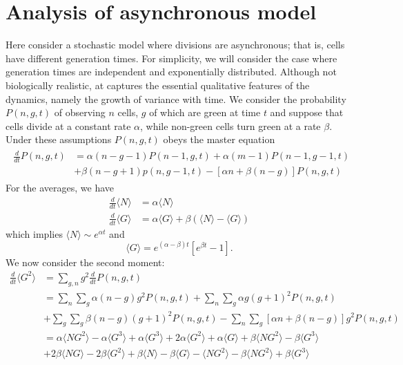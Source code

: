 \documentclass{article}
\begin{document}
\section{Analysis of asynchronous model}\label{app:async}

Here consider a stochastic model where divisions are asynchronous; that is, cells have different generation times. For simplicity, we will consider the case where generation times are independent and exponentially distributed. Although not biologically realistic, at captures the essential qualitative features of the dynamics, namely the growth of variance with time. We consider the probability $P(n,g,t)$ of observing $n$ cells, $g$ of which are green at time $t$ and suppose that cells divide at a constant rate $\alpha$, while non-green cells turn green at a rate $\beta$. Under these assumptions $P(n,g,t)$ obeys the master equation 
\begin{align}
\begin{split}
\frac{d}{dt}P(n,g,t) &= \alpha(n-g-1)P(n-1,g,t) + \alpha (m-1)P(n-1,g-1,t) \\
&+ \beta (n-g+1)p(n,g-1,t)- \left[\alpha n + \beta (n-g)  \right]P(n,g,t)
\end{split}
\end{align}
For the averages, we have
\begin{align}
\frac{d}{dt}\langle N  \rangle &= \alpha\langle N  \rangle \\
\frac{d}{dt}\langle G  \rangle &= \alpha\langle G  \rangle + \beta(\langle N\rangle - \langle  G\rangle)  
\end{align}
which implies $\langle N  \rangle  \sim e^{\alpha t}$ and 
\begin{equation}
\langle G \rangle = e^{(\alpha-\beta)t} \left[e^{\beta t} - 1\right].
\end{equation}
We now consider the second moment:
\begin{align}
\frac{d}{dt}\langle  G^2\rangle  &= \sum_{g,n} g^2 \frac{d}{dt}P(n,g,t)\\
&= \sum_n \sum_g \alpha (n-g) g^2 P(n,g,t) + \sum_n \sum_g \alpha g (g+1)^2 P(n,g,t)\\
&+ \sum_g \sum_g \beta (n-g)(g+1)^2 P(n,g,t) - \sum_n\sum_g \left[\alpha n + \beta(n-g) \right] g^2 P(n,g,t)\\
&= \alpha \langle  N G^2\rangle - \alpha \langle G^3 \rangle  + \alpha \langle  G^3\rangle 
  + 2 \alpha \langle  G^2\rangle  + \alpha \langle G \rangle  + \beta \langle N G^2 \rangle  - \beta \langle G^3 \rangle \\
&+ 2\beta \langle N G \rangle  - 2 \beta \langle G^2 \rangle  + \beta \langle  N\rangle  - \beta \langle  G\rangle 
 - \langle N G^2 \rangle - \beta \langle  N G^2\rangle  + \beta \langle G^3\rangle 
\end{align}
\end{document}
